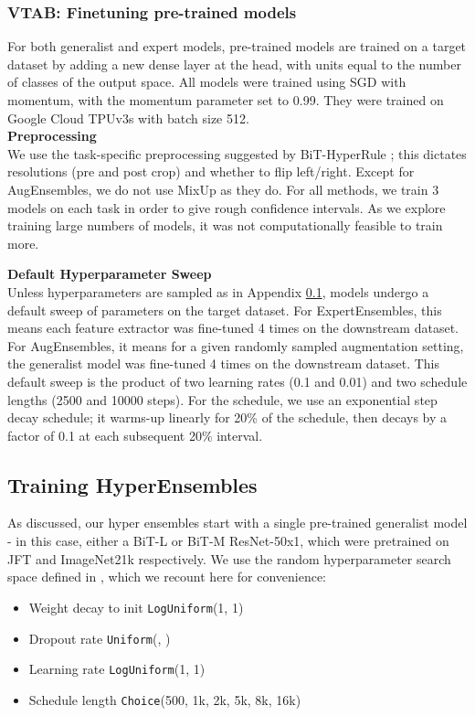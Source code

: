 \documentclass{article} \usepackage{iclr2021_conference,times}
\newcommand{\e}[1]{}
\begin{document}
\subsubsection{VTAB: Finetuning pre-trained models}
\label{app:finetuning}
For both generalist and expert models, pre-trained models are trained on a target dataset by adding a new dense layer at the head, with units equal to the number of classes of the output space. All models were trained using SGD with momentum, with the momentum parameter set to 0.99. They were trained on Google Cloud TPUv3s with batch size 512.\\

\textbf{Preprocessing}\\
We use the task-specific preprocessing suggested by BiT-HyperRule \citep{alex2019big}; this dictates resolutions (pre and post crop) and whether to flip left/right. Except for AugEnsembles, we do not use MixUp as they do. For all methods, we train 3 models on each task in order to give rough confidence intervals. As we explore training large numbers of models, it was not computationally feasible to train more.

\textbf{Default Hyperparameter Sweep}\\
Unless hyperparameters are sampled as in Appendix \ref{app:training_hes}, models undergo a default sweep of parameters on the target dataset. For ExpertEnsembles, this means each feature extractor was fine-tuned 4 times on the downstream dataset. For AugEnsembles, it means for a given randomly sampled augmentation setting, the generalist model was fine-tuned 4 times on the downstream dataset. This default sweep is the product of two learning rates (0.1 and 0.01) and two schedule lengths (2500 and 10000 steps). For the schedule, we use an exponential step decay schedule; it warms-up linearly for 20\% of the schedule, then decays by a factor of 0.1 at each subsequent 20\% interval.

\subsection{Training HyperEnsembles}
\label{app:training_hes}
As discussed, our hyper ensembles start with a single pre-trained generalist model - in this case, either a BiT-L or BiT-M ResNet-50x1, which were pretrained on JFT and ImageNet21k respectively. We use the random hyperparameter search space defined in \cite{alex2019big}, which we recount here for convenience:
\begin{itemize}
    \item Weight decay to init  \texttt{LogUniform}(1\e{-6}, 1\e{-1})
    \item Dropout rate   \texttt{Uniform}(, )
    \item Learning rate  \texttt{LogUniform}(1\e{-4}, 1\e{-1})
    \item Schedule length  \texttt{Choice}(500, 1k, 2k, 5k, 8k, 16k)
\end{itemize}
\end{document}
